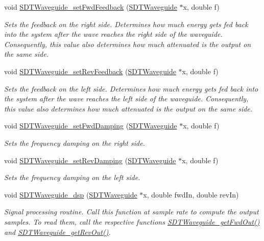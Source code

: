 \begin{DoxyCompactItemize}
void \hyperlink{group__waveguide_gab20c06383cccf4315b0a7824d1f0e9d8}{S\+D\+T\+Waveguide\+\_\+set\+Fwd\+Feedback} (\hyperlink{group__waveguide_gacfb2f045a30d1c89f0dc98ad18777f3d}{S\+D\+T\+Waveguide} $\ast$x, double f)
\begin{DoxyCompactList}\small\item\em Sets the feedback on the right side. Determines how much energy gets fed back into the system after the wave reaches the right side of the waveguide. Consequently, this value also determines how much attenuated is the output on the same side. \end{DoxyCompactList}\item 
void \hyperlink{group__waveguide_ga081c19f6094f688f3997a5dd6326fe10}{S\+D\+T\+Waveguide\+\_\+set\+Rev\+Feedback} (\hyperlink{group__waveguide_gacfb2f045a30d1c89f0dc98ad18777f3d}{S\+D\+T\+Waveguide} $\ast$x, double f)
\begin{DoxyCompactList}\small\item\em Sets the feedback on the left side. Determines how much energy gets fed back into the system after the wave reaches the left side of the waveguide. Consequently, this value also determines how much attenuated is the output on the same side. \end{DoxyCompactList}\item 
void \hyperlink{group__waveguide_ga23cf659d4c54e290bd395318942c2c6e}{S\+D\+T\+Waveguide\+\_\+set\+Fwd\+Damping} (\hyperlink{group__waveguide_gacfb2f045a30d1c89f0dc98ad18777f3d}{S\+D\+T\+Waveguide} $\ast$x, double f)
\begin{DoxyCompactList}\small\item\em Sets the frequency damping on the right side. \end{DoxyCompactList}\item 
void \hyperlink{group__waveguide_ga8306ff315ab957b8d0d2ad4a2430b303}{S\+D\+T\+Waveguide\+\_\+set\+Rev\+Damping} (\hyperlink{group__waveguide_gacfb2f045a30d1c89f0dc98ad18777f3d}{S\+D\+T\+Waveguide} $\ast$x, double f)
\begin{DoxyCompactList}\small\item\em Sets the frequency damping on the left side. \end{DoxyCompactList}\item 
void \hyperlink{group__waveguide_gabb62b0269c2d3f99bf6c7b6a96d39053}{S\+D\+T\+Waveguide\+\_\+dsp} (\hyperlink{group__waveguide_gacfb2f045a30d1c89f0dc98ad18777f3d}{S\+D\+T\+Waveguide} $\ast$x, double fwd\+In, double rev\+In)
\begin{DoxyCompactList}\small\item\em Signal processing routine. Call this function at sample rate to compute the output samples. To read them, call the respective functions \hyperlink{group__waveguide_gae64c6a70fe095d634acabc80d663fcc4}{S\+D\+T\+Waveguide\+\_\+get\+Fwd\+Out()} and \hyperlink{group__waveguide_ga8fa1474553353d75238269d40ec5df6f}{S\+D\+T\+Waveguide\+\_\+get\+Rev\+Out()}. \end{DoxyCompactList}\end{DoxyCompactItemize}


